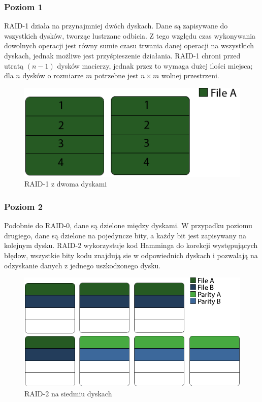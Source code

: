 \subsubsection{Poziom 1}
RAID-1 działa na przynajmniej dwóch dyskach. Dane są zapisywane do wszystkich dysków, tworząc lustrzane odbicia. Z tego względu czas wykonywania dowolnych operacji jest równy sumie czasu trwania danej operacji na wszystkich dyskach, jednak możliwe jest przyśpieszenie działania. RAID-1 chroni przed utratą $(n-1)$ dysków macierzy, jednak przez to wymaga dużej ilości miejsca; dla $n$ dysków o rozmiarze $m$ potrzebne jest $n\times m$ wolnej przestrzeni.
\begin{figure}[h!]
        \centering
        \includegraphics[scale=0.8]{raid-1.png}
        \caption{RAID-1 z dwoma dyskami}
        \label{fig:raid1}

\end{figure}

\subsubsection{Poziom 2}
Podobnie do RAID-0, dane są dzielone między dyskami. W przypadku poziomu drugiego, dane są dzielone na pojedyncze bity, a każdy bit jest zapisywany na kolejnym dysku. RAID-2 wykorzystuje kod Hamminga do korekcji występujących błędow, wszystkie bity kodu znajdują sie w odpowiednich dyskach i pozwalają na odzyskanie danych z jednego uszkodzonego dysku. 
\begin{figure}[h!tb]
        \centering
        \includegraphics[scale=0.8]{raid-2.png}
        \caption{RAID-2 na siedmiu dyskach}
        \label{fig:raid2}
\end{figure}
\newpage
